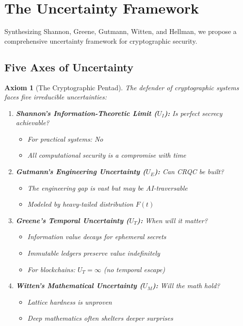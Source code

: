 \documentclass[11pt,a4paper]{article}
\newtheorem{axiom}[theorem]{Axiom}
\begin{document}
\section{The Uncertainty Framework}

Synthesizing Shannon, Greene, Gutmann, Witten, and Hellman, we propose a comprehensive uncertainty framework for cryptographic security.

\subsection{Five Axes of Uncertainty}

\begin{axiom}[The Cryptographic Pentad]
The defender of cryptographic systems faces five irreducible uncertainties:
\begin{enumerate}
    \item \textbf{Shannon's Information-Theoretic Limit ($U_I$):} \textit{Is perfect secrecy achievable?}
    \begin{itemize}[noitemsep]
        \item For practical systems: No
        \item All computational security is a compromise with time
    \end{itemize}

    \item \textbf{Gutmann's Engineering Uncertainty ($U_E$):} \textit{Can CRQC be built?}
    \begin{itemize}[noitemsep]
        \item The engineering gap is vast but may be AI-traversable
        \item Modeled by heavy-tailed distribution $F(t)$
    \end{itemize}

    \item \textbf{Greene's Temporal Uncertainty ($U_T$):} \textit{When will it matter?}
    \begin{itemize}[noitemsep]
        \item Information value decays for ephemeral secrets
        \item Immutable ledgers preserve value indefinitely
        \item For blockchains: $U_T = \infty$ (no temporal escape)
    \end{itemize}

    \item \textbf{Witten's Mathematical Uncertainty ($U_M$):} \textit{Will the math hold?}
    \begin{itemize}[noitemsep]
        \item Lattice hardness is unproven
        \item Deep mathematics often shelters deeper surprises
    \end{itemize}


\end{enumerate}
\end{axiom}
\end{document}
